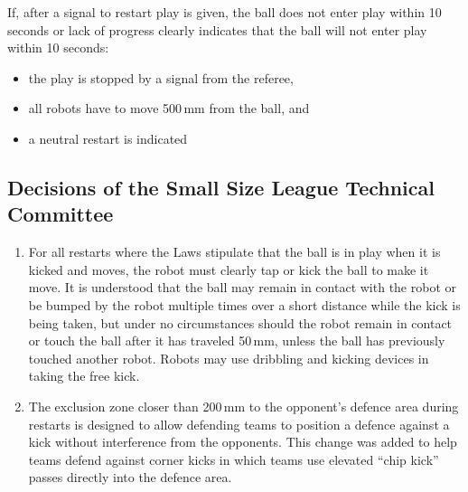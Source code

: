 If, after a signal to restart play is given, the ball does not enter play within 10 seconds or lack of progress clearly indicates that the ball will not enter play within 10 seconds:
\begin{itemize}
\item the play is stopped by a signal from the referee,
\item all robots have to move 500\,mm from the ball, and
\item a neutral restart is indicated
\end{itemize}

\subsection*{Decisions of the Small Size League Technical Committee}
\begin{enumerate}
\item
For all restarts where the Laws stipulate that the ball is in play when it is kicked and moves, the robot must clearly tap or kick the ball to make it move.
It is understood that the ball may remain in contact with the robot or be bumped by the robot multiple times over a short distance while the kick is being taken, but under no circumstances should the robot remain in contact or touch the ball after it has traveled 50\,mm, unless the ball has previously touched another robot.
Robots may use dribbling and kicking devices in taking the free kick.

\item
The exclusion zone closer than 200\,mm to the opponent's defence area during restarts is designed to allow defending teams to position a defence against a kick without interference from the opponents.
This change was added to help teams defend against corner kicks in which teams use elevated ``chip kick'' passes directly into the defence area.
\end{enumerate}
